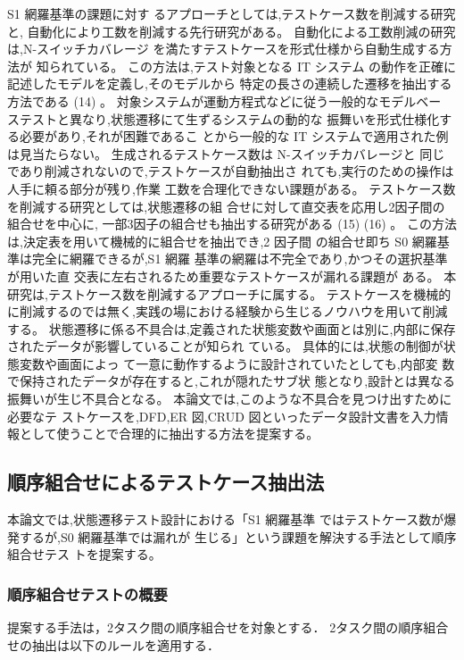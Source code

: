 \documentclass[10pt,a4j]{jarticle}
\begin{document}
S1 網羅基準の課題に対す るアプローチとしては,テストケース数を削減する研究と, 自動化により工数を削減する先行研究がある。
自動化による工数削減の研究は,N-スイッチカバレージ を満たすテストケースを形式仕様から自動生成する方法が 知られている。
この方法は,テスト対象となる IT システム の動作を正確に記述したモデルを定義し,そのモデルから 特定の長さの連続した遷移を抽出する方法である (14) 。
対象システムが運動方程式などに従う一般的なモデルベー ステストと異なり,状態遷移にて生ずるシステムの動的な 振舞いを形式仕様化する必要があり,それが困難であるこ とから一般的な IT システムで適用された例は見当たらない。
生成されるテストケース数は N-スイッチカバレージと 同じであり削減されないので,テストケースが自動抽出さ れても,実行のための操作は人手に頼る部分が残り,作業 工数を合理化できない課題がある。
テストケース数を削減する研究としては,状態遷移の組 合せに対して直交表を応用し2因子間の組合せを中心に, 一部3因子の組合せも抽出する研究がある (15) (16) 。
この方法 は,決定表を用いて機械的に組合せを抽出でき,2 因子間 の組合せ即ち S0 網羅基準は完全に網羅できるが,S1 網羅 基準の網羅は不完全であり,かつその選択基準が用いた直 交表に左右されるため重要なテストケースが漏れる課題が ある。
 本研究は,テストケース数を削減するアプローチに属する。
テストケースを機械的に削減するのでは無く,実践の場における経験から生じるノウハウを用いて削減する。
状態遷移に係る不具合は,定義された状態変数や画面とは別に,内部に保存されたデータが影響していることが知られ ている。
具体的には,状態の制御が状態変数や画面によっ て一意に動作するように設計されていたとしても,内部変 数で保持されたデータが存在すると,これが隠れたサブ状 態となり,設計とは異なる振舞いが生じ不具合となる。
本論文では,このような不具合を見つけ出すために必要なテ ストケースを,DFD,ER 図,CRUD 図といったデータ設計文書を入力情報として使うことで合理的に抽出する方法を提案する。

\subsection{順序組合せによるテストケース抽出法} \label{sec:5-2}
本論文では,状態遷移テスト設計における「S1 網羅基準 ではテストケース数が爆発するが,S0 網羅基準では漏れが 生じる」という課題を解決する手法として順序組合せテス トを提案する。

\subsubsection{順序組合せテストの概要} \label{sec:5-2-1}
提案する手法は，2タスク間の順序組合せを対象とする．
2タスク間の順序組合せの抽出は以下のルールを適用する．
\end{document}
